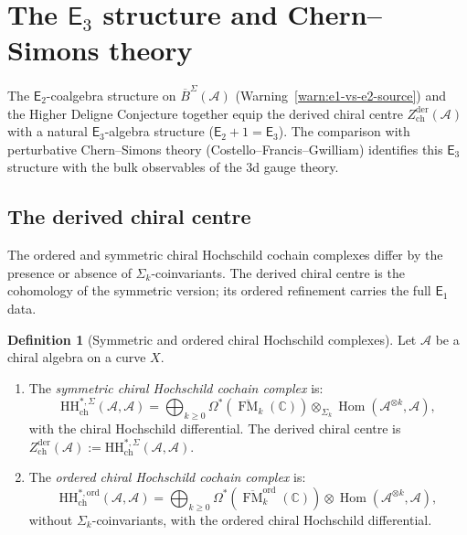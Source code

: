 \documentclass[11pt,reqno]{amsart}
\theoremstyle{definition}
\newtheorem{definition}[theorem]{Definition}
\theoremstyle{remark}
\newcommand{\cA}{\mathcal{A}}
\newcommand{\HH}{\mathrm{HH}}
\newcommand{\Eone}{\mathsf{E}_{1}}
\newcommand{\Etwo}{\mathsf{E}_{2}}
\newcommand{\Ethree}{\mathsf{E}_{3}}
\DeclareMathOperator{\Hom}{Hom}
\DeclareMathOperator{\FM}{FM}
\newcommand{\BarSig}{\overline{B}^{\Sigma}}
\newcommand{\CC}{\mathbb{C}}
\numberwithin{equation}{section}
\begin{document}
\section{The $\Ethree$ structure and Chern--Simons theory}
\label{sec:e3}

The $\Etwo$-coalgebra structure on $\BarSig(\cA)$
(Warning~\ref{warn:e1-vs-e2-source}) and the Higher
Deligne Conjecture together equip the derived chiral centre
$Z^{\mathrm{der}}_{\mathrm{ch}}(\cA)$ with a natural
$\Ethree$-algebra structure ($\Etwo + 1 = \Ethree$).
The comparison with perturbative Chern--Simons theory
(Costello--Francis--Gwilliam) identifies this $\Ethree$
structure with the bulk observables of the $3$d gauge theory.

\subsection{The derived chiral centre}
\label{subsec:derived-centre}

The ordered and symmetric chiral Hochschild cochain complexes
differ by the presence or absence of
$\Sigma_k$-coinvariants. The derived chiral centre is the
cohomology of the symmetric version; its ordered refinement
carries the full $\Eone$ data.

\begin{definition}[Symmetric and ordered chiral
Hochschild complexes]
\label{def:ch-hochschild}
Let $\cA$ be a chiral algebra on a curve $X$.
\begin{enumerate}[label=\textup{(\roman*)}]
\item The \emph{symmetric chiral Hochschild cochain complex}
  is:
  \begin{equation}\label{eq:sym-hh}
    \HH^{*,\Sigma}_{\mathrm{ch}}(\cA, \cA)
    = \bigoplus_{k \geq 0}
    \Omega^*(\overline{\FM}_k(\CC))
    \otimes_{\Sigma_k}
    \Hom(\cA^{\otimes k}, \cA),
  \end{equation}
  with the chiral Hochschild differential.
  The derived chiral centre is
  $Z^{\mathrm{der}}_{\mathrm{ch}}(\cA)
  := \HH^{*,\Sigma}_{\mathrm{ch}}(\cA, \cA)$.
\item The \emph{ordered chiral Hochschild cochain complex}
  is:
  \begin{equation}\label{eq:ord-hh}
    \HH^{*,\mathrm{ord}}_{\mathrm{ch}}(\cA, \cA)
    = \bigoplus_{k \geq 0}
    \Omega^*(\overline{\FM}_k^{\mathrm{ord}}(\CC))
    \otimes
    \Hom(\cA^{\otimes k}, \cA),
  \end{equation}
  without $\Sigma_k$-coinvariants, with the ordered chiral
  Hochschild differential.
\end{enumerate}
\end{definition}
\end{document}
